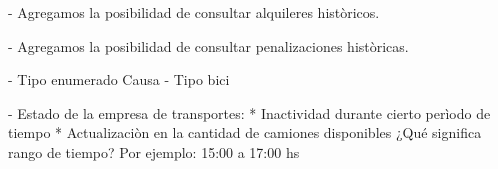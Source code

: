 - Agregamos la posibilidad de consultar alquileres històricos.

- Agregamos la posibilidad de consultar penalizaciones històricas.

- Tipo enumerado Causa
- Tipo bici

- Estado de la empresa de transportes:
* Inactividad durante cierto perìodo de tiempo
* Actualizaciòn en la cantidad de camiones disponibles
¿Qué significa rango de tiempo? Por ejemplo: 15:00 a 17:00 hs




